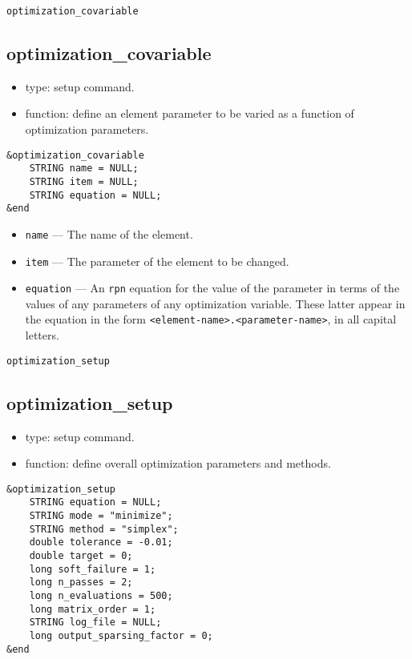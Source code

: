\documentclass[11pt]{article}
\begin{document}
\begin{latexonly}
\newpage
\begin{center}{\Large\verb|optimization_covariable|}\end{center}
\end{latexonly}
\subsection{optimization\_covariable}

\begin{itemize}
\item type: setup command.
\item function: define an element parameter to be varied as a function of optimization parameters.
\end{itemize}

\begin{verbatim}
&optimization_covariable
    STRING name = NULL;
    STRING item = NULL;
    STRING equation = NULL;
&end
\end{verbatim}

\begin{itemize}
\item \verb|name| --- The name of the element.
\item \verb|item| --- The parameter of the element to be changed.
\item \verb|equation| --- An {\tt rpn} equation for the value of the parameter in terms of the
values of any parameters of any optimization variable.  These latter appear in the equation in the
form \verb|<element-name>.<parameter-name>|, in all capital letters.
\end{itemize}

\begin{latexonly}
\newpage
\begin{center}{\Large\verb|optimization_setup|}\end{center}
\end{latexonly}
\subsection{optimization\_setup}

\begin{itemize}
\item type: setup command.
\item function: define overall optimization parameters and methods.
\end{itemize}

\begin{verbatim}
&optimization_setup
    STRING equation = NULL;
    STRING mode = "minimize";
    STRING method = "simplex";
    double tolerance = -0.01;
    double target = 0;
    long soft_failure = 1;
    long n_passes = 2;
    long n_evaluations = 500; 
    long matrix_order = 1;
    STRING log_file = NULL;
    long output_sparsing_factor = 0;
&end
\end{verbatim}
\end{document}

